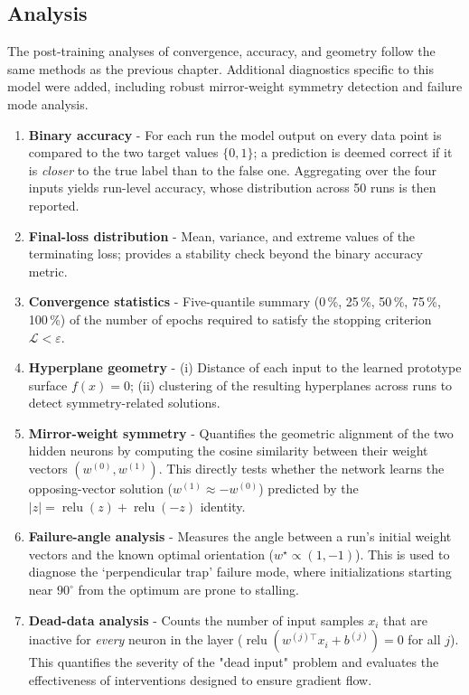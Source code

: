 \subsection*{Analysis}
The post-training analyses of convergence, accuracy, and geometry follow the same methods as the previous chapter. Additional diagnostics specific to this model were added, including robust mirror-weight symmetry detection and failure mode analysis.

\begin{enumerate}[label=(A\arabic*)]
    \item \textbf{Binary accuracy} -  
        For each run the model output on every data point is compared to the
        two target values \(\{0,1\}\); a prediction is deemed correct if it
        is \emph{closer} to the true label than to the false one.
        Aggregating over the four inputs yields run-level accuracy, whose
        distribution across 50 runs is then reported.
    \item \textbf{Final-loss distribution} -  
        Mean, variance, and extreme values of the terminating loss; provides
        a stability check beyond the binary accuracy metric.
    \item \textbf{Convergence statistics} -  
        Five-quantile summary (0\,\%, 25\,\%, 50\,\%, 75\,\%, 100\,\%) of
        the number of epochs required to satisfy the stopping criterion
        \(\mathcal{L}<\varepsilon\).
    \item \textbf{Hyperplane geometry} -  
        (i) Distance of each input to the learned prototype surface
        \(f(x)=0\);  
        (ii) clustering of the resulting hyperplanes across runs to detect
        symmetry-related solutions.
    \item \textbf{Mirror-weight symmetry} - 
        Quantifies the geometric alignment of the two hidden neurons by computing the cosine similarity between their weight vectors \((w^{(0)}, w^{(1)})\). This directly tests whether the network learns the opposing-vector solution (\(w^{(1)} \approx -w^{(0)}\)) predicted by the \(|z|=\operatorname{relu}(z)+\operatorname{relu}(-z)\) identity.
    \item \textbf{Failure-angle analysis} - 
        Measures the angle between a run's initial weight vectors and the known optimal orientation (\(w^\star \propto (1,-1)\)). This is used to diagnose the `perpendicular trap' failure mode, where initializations starting near \(90^\circ\) from the optimum are prone to stalling.
    \item \textbf{Dead-data analysis} - 
        Counts the number of input samples \(x_i\) that are inactive for \emph{every} neuron in the layer (\(\operatorname{relu}(w^{(j)\!\top}x_i+b^{(j)})=0\) for all \(j\)). This quantifies the severity of the "dead input" problem and evaluates the effectiveness of interventions designed to ensure gradient flow.
\end{enumerate}

